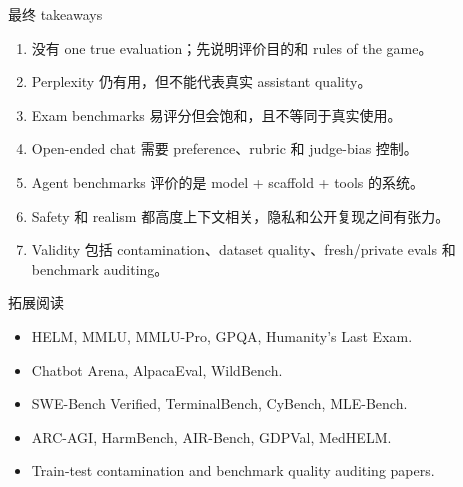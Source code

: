 \documentclass[a4paper]{article}
\begin{document}
\begin{importantbox}{最终 takeaways}
\begin{enumerate}
    \item 没有 one true evaluation；先说明评价目的和 rules of the game。
    \item Perplexity 仍有用，但不能代表真实 assistant quality。
    \item Exam benchmarks 易评分但会饱和，且不等同于真实使用。
    \item Open-ended chat 需要 preference、rubric 和 judge-bias 控制。
    \item Agent benchmarks 评价的是 model + scaffold + tools 的系统。
    \item Safety 和 realism 都高度上下文相关，隐私和公开复现之间有张力。
    \item Validity 包括 contamination、dataset quality、fresh/private evals 和 benchmark auditing。
\end{enumerate}
\end{importantbox}

\begin{knowledgebox}{拓展阅读}
\begin{itemize}
    \item HELM, MMLU, MMLU-Pro, GPQA, Humanity's Last Exam.
    \item Chatbot Arena, AlpacaEval, WildBench.
    \item SWE-Bench Verified, TerminalBench, CyBench, MLE-Bench.
    \item ARC-AGI, HarmBench, AIR-Bench, GDPVal, MedHELM.
    \item Train-test contamination and benchmark quality auditing papers.
\end{itemize}
\end{knowledgebox}
\end{document}
